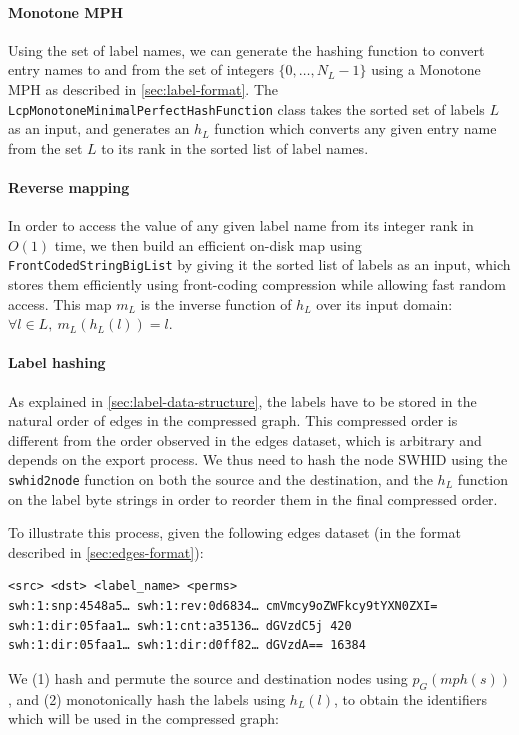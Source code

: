 \paragraph{Monotone MPH}
Using the set of label names, we can generate the hashing function to convert
entry names to and from the set of integers $\{0, \ldots, N_L-1\}$ using a
Monotone \gls{MPH} as described in \cref{sec:label-format}. The
\texttt{LcpMonotoneMinimalPerfectHashFunction} class takes the sorted set of
labels $L$ as an input, and generates an $h_L$ function which converts any
given entry name from the set $L$ to its rank in the sorted list of label
names.

\paragraph{Reverse mapping}
In order to access the value of any given label name from its integer rank in
$O(1)$ time, we then build an efficient on-disk map using
\texttt{FrontCodedStringBigList} by giving it the sorted list of labels
as an input, which stores them efficiently using front-coding compression while
allowing fast random access. This map $m_L$ is the inverse function
of $h_L$ over its input domain: $\forall l \in L,~m_L(h_L(l)) = l$.

\paragraph{Label hashing}
As explained in \cref{sec:label-data-structure}, the labels have to be stored
in the natural order of edges in the compressed graph. This compressed order is
different from the order observed in the edges dataset, which is
arbitrary and depends on the export process. We thus need to hash the node
\gls{SWHID} using the \texttt{swhid2node} function on both the source and the
destination, and the $h_L$ function on the label byte strings in order to
reorder them in the final compressed order.

To illustrate this process, given the following edges dataset (in the format
described in \cref{sec:edges-format}):

\begin{verbatim}
<src> <dst> <label_name> <perms>
swh:1:snp:4548a5… swh:1:rev:0d6834… cmVmcy9oZWFkcy9tYXN0ZXI=
swh:1:dir:05faa1… swh:1:cnt:a35136… dGVzdC5j 420
swh:1:dir:05faa1… swh:1:dir:d0ff82… dGVzdA== 16384
\end{verbatim}

We (1) hash and permute the source and destination nodes using
$p_G(\mathit{mph}(s))$, and (2) monotonically hash the labels using $h_L(l)$,
to obtain the identifiers which will be used in the compressed graph:

